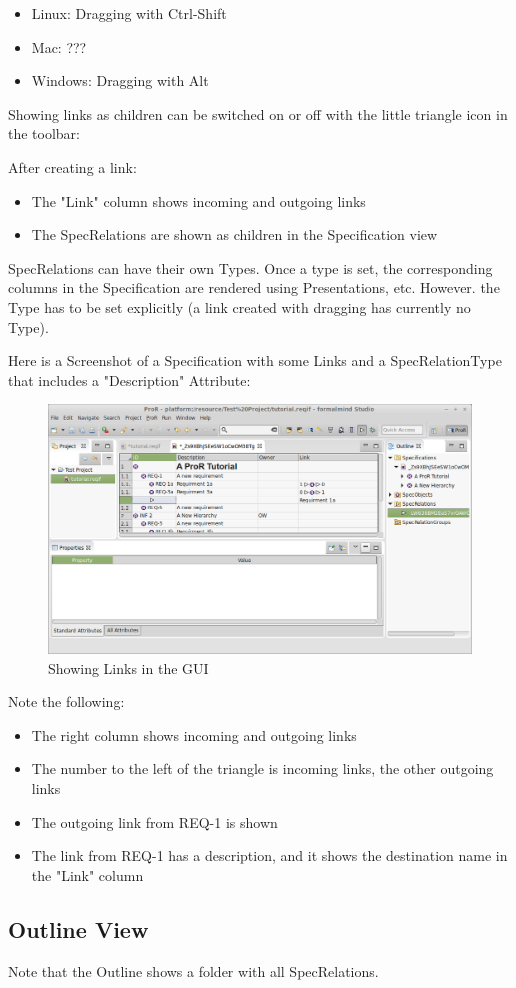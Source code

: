 \begin{itemize}

\item
  Linux: Dragging with Ctrl-Shift
\item
  Mac: ???
\item
  Windows: Dragging with Alt
\end{itemize}

Showing links as children can be switched on or off with the little triangle icon in the toolbar:

After creating a link:

\begin{itemize}
\item
  The "Link" column shows incoming and outgoing links
\item
  The SpecRelations are shown as children in the Specification view
\end{itemize}

SpecRelations can have their own Types.  Once a type is set, the corresponding columns in the Specification are rendered using Presentations, etc.  However.  the Type has to be set explicitly (a link created with dragging has currently no Type).

Here is a Screenshot of a Specification with some Links and a SpecRelationType that includes a "Description" Attribute:

\begin{figure}[h!]      
\centering      
\includegraphics[width=\linewidth]{../rmf-images/links.png}      
\caption{Showing Links in the GUI}      
\label{fig:linksInGui}
\end{figure}

Note the following:

\begin{itemize}
\item
  The right column shows incoming and outgoing links
\item
  The number to the left of the triangle is incoming links, the other outgoing links
\item
  The outgoing link from REQ-1 is shown
\item
  The link from REQ-1 has a description, and it shows the destination name in the "Link" column
\end{itemize}

\subsection{Outline View}

Note that the Outline shows a folder with all SpecRelations.

